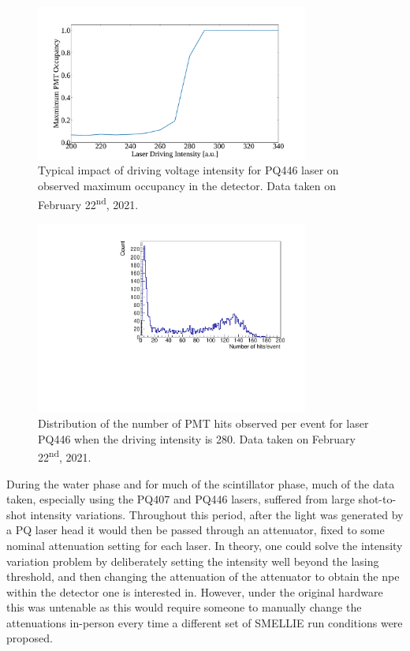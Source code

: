 \begin{figure}
    \centering
    \includegraphics[width=0.8\textwidth]{3_SMELLIEHardware/images/smellie_intensity_scan_pq446_old.pdf}
    \caption[Typical impact of driving voltage intensity for PQ446 laser on observed maximum occupancy in the detector]
    {Typical impact of driving voltage intensity for PQ446 laser on observed maximum occupancy in the detector. Data taken on February 22\textsuperscript{nd}, 2021.}
    \label{fig:pq_old_intensity_dependence}
\end{figure}

\begin{figure}
    \centering
    \includegraphics[width=0.8\textwidth]{3_SMELLIEHardware/images/run_268221_8_nhit_dist.pdf}
    \caption[Distribution of the number of PMT hits observed per event for laser PQ446]
    {Distribution of the number of PMT hits observed per event for laser PQ446 when the driving intensity is 280. Data taken on February 22\textsuperscript{nd}, 2021.}
    \label{fig:pq_threshold_intensity_variation}
\end{figure}

During the water phase and for much of the scintillator phase, much of the data taken, especially using the PQ407 and PQ446 lasers, suffered from large shot-to-shot intensity variations. Throughout this period, after the light was generated by a PQ laser head it would then be passed through an attenuator, fixed to some nominal attenuation setting for each laser. In theory, one could solve the intensity variation problem by deliberately setting the intensity well beyond the lasing threshold, and then changing the attenuation of the attenuator to obtain the npe within the detector one is interested in. However, under the original hardware this was untenable as this would require someone to manually change the attenuations in-person every time a different set of SMELLIE run conditions were proposed.


